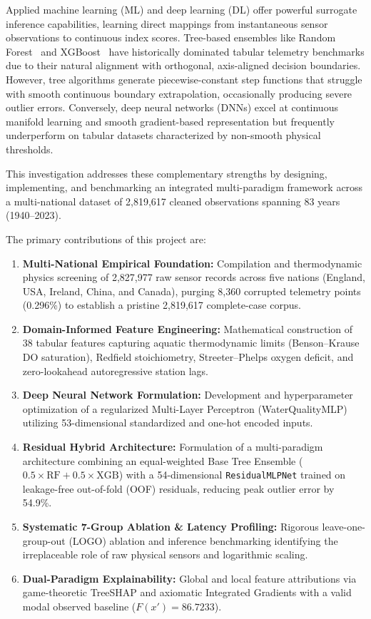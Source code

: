 \documentclass[conference]{IEEEtran}
\begin{document}
Applied machine learning (ML) and deep learning (DL) offer powerful surrogate inference capabilities, learning direct mappings from instantaneous sensor observations to continuous index scores. Tree-based ensembles like Random Forest~\cite{breiman2001random} and XGBoost~\cite{chen2016xgboost} have historically dominated tabular telemetry benchmarks due to their natural alignment with orthogonal, axis-aligned decision boundaries. However, tree algorithms generate piecewise-constant step functions that struggle with smooth continuous boundary extrapolation, occasionally producing severe outlier errors. Conversely, deep neural networks (DNNs) excel at continuous manifold learning and smooth gradient-based representation but frequently underperform on tabular datasets characterized by non-smooth physical thresholds.

This investigation addresses these complementary strengths by designing, implementing, and benchmarking an integrated multi-paradigm framework across a multi-national dataset of 2,819,617 cleaned observations spanning 83 years (1940--2023).

The primary contributions of this project are:
\begin{enumerate}
  \item \textbf{Multi-National Empirical Foundation:} Compilation and thermodynamic physics screening of 2,827,977 raw sensor records across five nations (England, USA, Ireland, China, and Canada), purging 8,360 corrupted telemetry points (0.296\%) to establish a pristine 2,819,617 complete-case corpus.
  \item \textbf{Domain-Informed Feature Engineering:} Mathematical construction of 38 tabular features capturing aquatic thermodynamic limits (Benson--Krause DO saturation), Redfield stoichiometry, Streeter--Phelps oxygen deficit, and zero-lookahead autoregressive station lags.
  \item \textbf{Deep Neural Network Formulation:} Development and hyperparameter optimization of a regularized Multi-Layer Perceptron (WaterQualityMLP) utilizing 53-dimensional standardized and one-hot encoded inputs.
  \item \textbf{Residual Hybrid Architecture:} Formulation of a multi-paradigm architecture combining an equal-weighted Base Tree Ensemble ($0.5\times\text{RF} + 0.5\times\text{XGB}$) with a 54-dimensional \texttt{ResidualMLPNet} trained on leakage-free out-of-fold (OOF) residuals, reducing peak outlier error by 54.9\%.
  \item \textbf{Systematic 7-Group Ablation \& Latency Profiling:} Rigorous leave-one-group-out (LOGO) ablation and inference benchmarking identifying the irreplaceable role of raw physical sensors and logarithmic scaling.
  \item \textbf{Dual-Paradigm Explainability:} Global and local feature attributions via game-theoretic TreeSHAP and axiomatic Integrated Gradients with a valid modal observed baseline ($F(x') = 86.7233$).
\end{enumerate}
\end{document}
